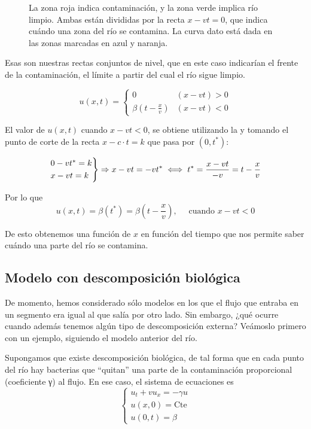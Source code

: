 		\begin{figure}[hbtp]
			\centering
			\caption{La zona roja indica contaminación, y la zona verde implica río limpio. Ambas están divididas por la recta $x - vt = 0$, que indica cuándo una zona del río se contamina. La curva dato está dada en las zonas marcadas en azul y naranja.}
			\label{fig:ContaminacionRio}
		\end{figure}

		Esas son nuestras rectas conjuntos de nivel, que en este caso indicarían el frente de la contaminación, el límite a partir del cual el río sigue limpio.

		$$u(x,t) =
			\begin{cases}
				0                      & (x-vt) > 0 \\
				\beta(t - \frac{x}{v}) & (x-vt) < 0
			\end{cases}
		$$

		El valor de $u(x,t)$ cuando $x-vt < 0$, se obtiene utilizando la  y tomando el punto de corte de la recta $x-c \cdot t=k$ que pasa por $(0,t^*)$:

		$$
		\begin{rcases}
			0 - vt^{*} = k \\
			x - vt = k
		\end{rcases}
		 \Rightarrow x-vt = -vt^{*} \iff t^* = \frac{x-vt}{-v} = t - \frac{x}{v}$$

		Por lo que
		$$u(x,t) = \beta(t^*) = \beta(t - \frac{x}{v}), \quad \text{ cuando } x - vt < 0$$

		De esto obtenemos una función de $x$ en función del tiempo que nos permite saber cuándo una parte del río se contamina.

	\subsection{Modelo con descomposición biológica}

	De momento, hemos considerado sólo modelos en los que el flujo que entraba en un segmento era igual al que salía por otro lado. Sin embargo, ¿qué ocurre cuando además tenemos algún tipo de descomposición externa? Veámoslo primero con un ejemplo, siguiendo el modelo anterior del río.

		Supongamos que existe descomposición biológica, de tal forma que en cada punto del río hay bacterias que ``quitan'' una parte de la contaminación proporcional (coeficiente γ) al flujo. En ese caso, el sistema de ecuaciones es \[
		\begin{cases}
		u_t + vu_x = -\gamma u \\
		u(x,0) = \text{Cte} \\
		u(0,t) = \beta
		\end{cases} \]

